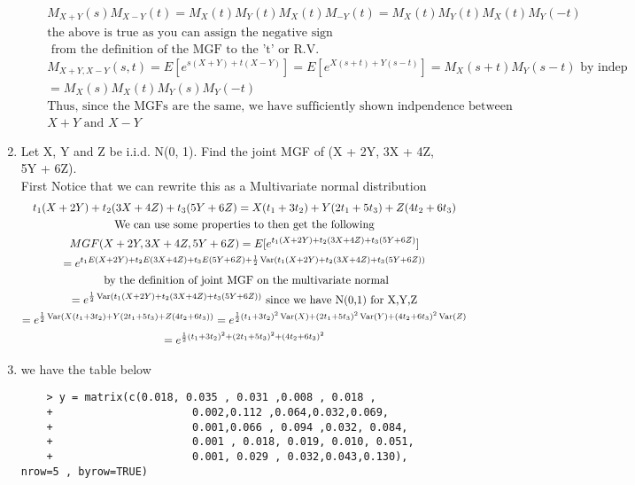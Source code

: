 \documentclass[11pt]{article}
\newcommand{\Var}{\mathop{\rm Var}}
\begin{document}
\begin{enumerate}
\begin{enumerate}
\begin{gather}
		M_{X+Y}(s)M_{X-Y}(t) =M_X(t)M_Y(t)M_X(t)M_{-Y}(t) = M_X(t)M_Y(t)M_X(t)M_{Y}(-t)\\
		\text{the above is true as you can assign the negative sign}\\
		\text{ from the definition of the MGF to the 't' or R.V.}\\
		M_{X+Y,X-Y}(s,t) = E[e^{s(X+Y) + t(X-Y)}]= E[e^{X(s+t)+Y(s-t)}] = M_X(s+t)M_Y(s-t) \text{ by indep}\\
		= M_X(s)M_X(t)M_Y(s)M_Y(-t)\\
		\text{Thus, since the MGFs are the same, we have sufficiently shown indpendence between}\\
		X+Y \text{ and } X-Y
	\end{gather}
\end{enumerate}
\item Let X, Y and Z be i.i.d. N(0, 1). Find the joint MGF of (X + 2Y, 3X + 4Z, 5Y + 6Z).\\
First Notice that we can rewrite this as a Multivariate normal distribution
\begin{gather}
	t_1(X+2Y)+t_2(3X + 4Z)+t_3(5Y + 6Z) = X(t_1+3t_2) + Y(2t_1+5t_3) + Z(4t_2+6t_3)\\
	\text{We can use some properties to then get the following}\\
	MGF(X + 2Y, 3X + 4Z, 5Y + 6Z) = E[e^{t_1(X + 2Y) + t_2(3X + 4Z) + t_3(5Y+6Z)}] \\
	= e^{t_1E(X + 2Y) + t_2E(3X + 4Z) + t_3E(5Y+6Z) + \frac{1}{2} \Var(t_1(X + 2Y) + t_2(3X + 4Z) + t_3(5Y+6Z))} \\
	\text{ by the definition of joint MGF on the multivariate normal}\\
	= e^{\frac{1}{2} \Var(t_1(X + 2Y) + t_2(3X + 4Z) + t_3(5Y+6Z))} \text{ since we have N(0,1) for X,Y,Z}\\
	=e^{\frac{1}{2} \Var(X(t_1+3t_2) + Y(2t_1+5t_3) + Z(4t_2+6t_3))}
	=e^{\frac{1}{2} (t_1+3t_2)^2\Var(X)+(2t_1+5t_3)^2\Var(Y) + (4t_2+6t_3)^2\Var(Z)}\\
	=e^{\frac{1}{2} (t_1+3t_2)^2+(2t_1+5t_3)^2 + (4t_2+6t_3)^2}
\end{gather}
\item we have the table below
\begin{verbatim}
	> y = matrix(c(0.018, 0.035 , 0.031 ,0.008 , 0.018 ,
	+                      0.002,0.112 ,0.064,0.032,0.069,
	+                      0.001,0.066 , 0.094 ,0.032, 0.084,
	+                      0.001 , 0.018, 0.019, 0.010, 0.051,
	+                      0.001, 0.029 , 0.032,0.043,0.130), nrow=5 , byrow=TRUE)

\end{verbatim}
\end{enumerate}
\end{document}
